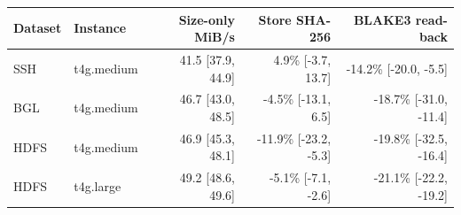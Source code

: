 
\begin{tabular}{@{}llrrr@{}}
\toprule
Dataset & Instance & Size-only MiB/s & Store SHA-256 & BLAKE3 read-back \\
\midrule
SSH & t4g.medium & 41.5 [37.9, 44.9] & 4.9\% [-3.7, 13.7] & -14.2\% [-20.0, -5.5] \\
BGL & t4g.medium & 46.7 [43.0, 48.5] & -4.5\% [-13.1, 6.5] & -18.7\% [-31.0, -11.4] \\
HDFS & t4g.medium & 46.9 [45.3, 48.1] & -11.9\% [-23.2, -5.3] & -19.8\% [-32.5, -16.4] \\
HDFS & t4g.large & 49.2 [48.6, 49.6] & -5.1\% [-7.1, -2.6] & -21.1\% [-22.2, -19.2] \\
\bottomrule
\end{tabular}
